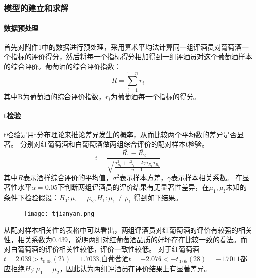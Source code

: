 \documentclass[UTF8,12.05pt]{ctexart}
\begin{document}
\subsubsection{\heiti{}模型的建立和求解}
\paragraph{数据预处理}首先对附件1中的数据进行预处理，采用算术平均法计算同一组评酒员对葡萄酒一个指标的评价得分，然后将每一个指标得分相加得到一组评酒员对这个葡萄酒样本的综合评价。葡萄酒的综合评价指数：
$$R=\sum_{i=1}^{i=n}r_{i}$$
其中R为葡萄酒的综合评价指数，$r_{i}$为葡萄酒每一个指标的得分。
\paragraph{t检验}
t检验是用t分布理论来推论差异发生的概率，从而比较两个平均数的差异是否显著。
分别对红葡萄酒和白葡萄酒做两组综合评价的配对样本t检验。
$$t=\frac{\overline{R_{1}}-\overline{R_{2}}}{\sqrt{\frac{\sigma_{R_{1}}^{2}+\sigma_{R_{2}}^{2}-2\gamma\sigma_{R_{1}}\sigma_{R_{1}}}{n-1}}}$$
其中$\overline{R}$表示酒样综合评价的平均值，$\sigma^{2}$表示样本方差，$\gamma$表示样本相关系数。
在显著性水平$\alpha=0.05$下判断两组评酒员的评价结果有无显著性差异，在$\mu_{1},\mu_{2}$未知的条件下检验假设：$H_{0}:\mu_{1}=\mu_{2},H_{1}:\mu_{1}\neq\mu_{1}$
得到如下结果。
\begin{figure}[H]
  \centering
  \texttt{[image: tjianyan.png]}
\end{figure}
从配对样本相关性的表格中可以看出，两组评酒员对红葡萄酒的评价有较强的相关性，相关系数为0.439，说明两组对红葡萄酒品质的好坏存在比较一致的看法。而对白葡萄酒的评价相关性较低，评价一致性较低。
\newline
对于红葡萄酒$t=2.039>t_{0.05}(27)=1.7033$,白葡萄酒$t=-2.076<-t_{0.05}(28)=-1.7011$都应拒绝$H_ {0}:\mu_{1}=\mu_{2}$，因此认为两组评酒员在评价结果上有显著差异。
\newline
\end{document}
